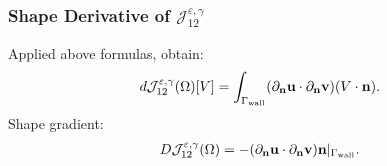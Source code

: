 \documentclass[10pt,xcolor=table,english]{beamer}   %
\begin{document}
\begin{frame}
    \frametitle{Shape Derivative of $\mathcal{J}_{12}^{\varepsilon,\gamma}$}
    Applied above formulas, obtain:
    \begin{align*}
    d\mathcal{J}_{12}^{\varepsilon,\gamma}(\Omega)[V] = \int_{\Gamma_{\rm wall}} (\partial_{\bf n}{\bf u}\cdot\partial_{\bf n}{\bf v})(V\cdot{\bf n}).
    \end{align*}
    Shape gradient:
    \begin{align*}
    D\mathcal{J}_{12}^{\varepsilon,\gamma}(\Omega) = -(\partial_{\bf n}{\bf u}\cdot\partial_{\bf n}{\bf v}){\bf n}|_{\Gamma_{\rm wall}}.
    \end{align*}
\end{frame}
\end{document}
